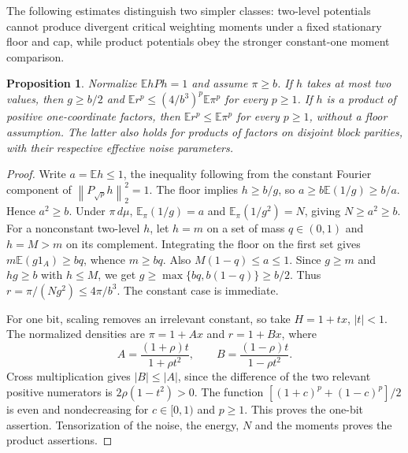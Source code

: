 \documentclass[11pt]{article}
\newcommand{\E}{\mathbb E}
\newcommand{\norm}[1]{\left\|#1\right\|}
\newtheorem{proposition}[theorem]{Proposition}
\begin{document}
The following estimates distinguish two simpler classes: two-level potentials cannot produce divergent critical weighting moments under a fixed stationary floor and cap, while product potentials obey the stronger constant-one moment comparison.
\begin{proposition}\label{simplefamilies}
Normalize $\E hPh=1$ and assume $\pi\geq b$. If $h$ takes at most two values, then $g\geq b/2$ and
$\E r^p\leq(4/b^3)^p\E\pi^p$ for every $p\geq1$.
If $h$ is a product of positive one-coordinate factors, then $\E r^p\leq\E\pi^p$ for every $p\geq1$, without a floor assumption. The latter also holds for products of factors on disjoint block parities, with their respective effective noise parameters.
\end{proposition}
\begin{proof}
Write $a=\E h\leq1$, the inequality following from the constant Fourier component of $\norm{P_{\sqrt\rho}h}_2^2=1$. The floor implies $h\geq b/g$, so $a\geq b\E(1/g)\geq b/a$. Hence $a^2\geq b$. Under $\pi\,d\mu$,
$\E_\pi(1/g)=a$ and $\E_\pi(1/g^2)=N$, giving $N\geq a^2\geq b$.
For a nonconstant two-level $h$, let $h=m$ on a set of mass $q\in(0,1)$ and $h=M>m$ on its complement. Integrating the floor on the first set gives $m\E(g1_A)\geq bq$, whence $m\geq bq$. Also $M(1-q)\leq a\leq1$. Since $g\geq m$ and $hg\geq b$ with $h\leq M$, we get $g\geq\max\{bq,b(1-q)\}\geq b/2$. Thus $r=\pi/(Ng^2)\leq4\pi/b^3$. The constant case is immediate.

For one bit, scaling removes an irrelevant constant, so take $H=1+tx$, $|t|<1$. The normalized densities are $\pi=1+Ax$ and $r=1+Bx$, where
\[
 A=\frac{(1+\rho)t}{1+\rho t^2},\qquad
 B=\frac{(1-\rho)t}{1-\rho t^2}.
\]
Cross multiplication gives $|B|\leq|A|$, since the difference of the two relevant positive numerators is $2\rho(1-t^2)>0$. The function
$[(1+c)^p+(1-c)^p]/2$ is even and nondecreasing for $c\in[0,1)$ and $p\geq1$. This proves the one-bit assertion. Tensorization of the noise, the energy, $N$ and the moments proves the product assertions.
\end{proof}
\end{document}
